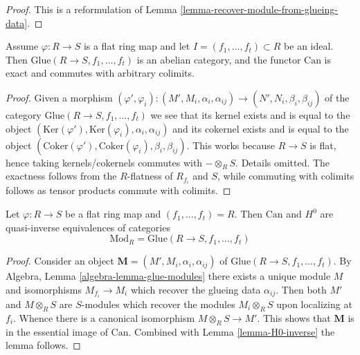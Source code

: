 \begin{proof}
This is a reformulation of
Lemma \ref{lemma-recover-module-from-glueing-data}.
\end{proof}

\begin{lemma}
\label{lemma-exact}
Assume $\varphi : R \to S$ is a flat ring map and let
$I = (f_1, \ldots, f_t) \subset R$ be an ideal.
Then $\text{Glue}(R \to S, f_1, \ldots, f_t)$ is an abelian category, and
the functor $\text{Can}$ is exact and commutes with arbitrary colimits.
\end{lemma}

\begin{proof}
Given a morphism
$(\varphi', \varphi_i) :
(M', M_i, \alpha_i, \alpha_{ij})
\to
(N', N_i, \beta_i, \beta_{ij})$
of the category $\text{Glue}(R \to S, f_1, \ldots, f_t)$
we see that its kernel exists and is equal to the object
$(\text{Ker}(\varphi'), \text{Ker}(\varphi_i), \alpha_i, \alpha_{ij})$
and its cokernel exists and is equal to the object
$(\text{Coker}(\varphi'), \text{Coker}(\varphi_i), \beta_i, \beta_{ij})$.
This works because $R \to S$ is flat, hence taking kernels/cokernels
commutes with $- \otimes_R S$. Details omitted.
The exactness follows from the $R$-flatness of $R_{f_i}$ and $S$, while
commuting with colimits follows as tensor products commute with colimits.
\end{proof}

\begin{lemma}
\label{lemma-equivalence-I-unit}
Let $\varphi : R \to S$ be a flat ring map and $(f_1, \ldots, f_t) = R$.
Then $\text{Can}$ and $H^0$ are quasi-inverse equivalences of categories
$$
\text{Mod}_R = \text{Glue}(R \to S, f_1, \ldots, f_t)
$$
\end{lemma}

\begin{proof}
Consider an object $\mathbf{M} = (M', M_i, \alpha_i, \alpha_{ij})$
of $\text{Glue}(R \to S, f_1, \ldots, f_t)$. By
Algebra, Lemma \ref{algebra-lemma-glue-modules}
there exists a unique module $M$ and isomorphisms
$M_{f_i} \to M_i$ which recover the glueing data $\alpha_{ij}$.
Then both $M'$ and $M \otimes_R S$ are $S$-modules
which recover the modules $M_i \otimes_R S$ upon localizing at $f_i$.
Whence there is a canonical isomorphism $M \otimes_R S \to M'$.
This shows that $\mathbf{M}$ is in the essential image of $\text{Can}$.
Combined with
Lemma \ref{lemma-H0-inverse}
the lemma follows.
\end{proof}

